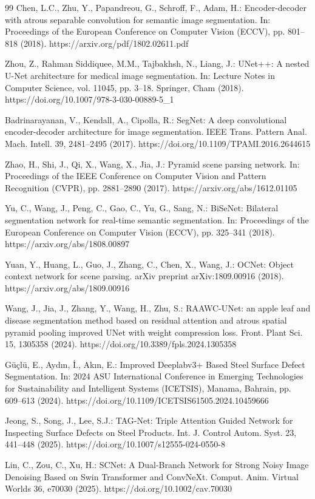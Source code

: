 \documentclass[sn-basic]{sn-jnl}
\theoremstyle{thmstyleone}%
\theoremstyle{thmstyletwo}%
\theoremstyle{thmstylethree}%
\begin{document}
\begin{thebibliography}{99}
 Chen, L.C., Zhu, Y., Papandreou, G., Schroff, F., Adam, H.: Encoder-decoder with atrous separable convolution for semantic image segmentation. In: Proceedings of the European Conference on Computer Vision (ECCV), pp. 801–818 (2018). https://arxiv.org/pdf/1802.02611.pdf

 Zhou, Z., Rahman Siddiquee, M.M., Tajbakhsh, N., Liang, J.: UNet++: A nested U-Net architecture for medical image segmentation. In: Lecture Notes in Computer Science, vol. 11045, pp. 3–18. Springer, Cham (2018). https://doi.org/10.1007/978-3-030-00889-5\_1

 Badrinarayanan, V., Kendall, A., Cipolla, R.: SegNet: A deep convolutional encoder-decoder architecture for image segmentation. IEEE Trans. Pattern Anal. Mach. Intell. 39, 2481–2495 (2017). https://doi.org/10.1109/TPAMI.2016.2644615

 Zhao, H., Shi, J., Qi, X., Wang, X., Jia, J.: Pyramid scene parsing network. In: Proceedings of the IEEE Conference on Computer Vision and Pattern Recognition (CVPR), pp. 2881–2890 (2017). https://arxiv.org/abs/1612.01105

 Yu, C., Wang, J., Peng, C., Gao, C., Yu, G., Sang, N.: BiSeNet: Bilateral segmentation network for real-time semantic segmentation. In: Proceedings of the European Conference on Computer Vision (ECCV), pp. 325–341 (2018). https://arxiv.org/abs/1808.00897

 Yuan, Y., Huang, L., Guo, J., Zhang, C., Chen, X., Wang, J.: OCNet: Object context network for scene parsing. arXiv preprint arXiv:1809.00916 (2018). https://arxiv.org/abs/1809.00916

 Wang, J., Jia, J., Zhang, Y., Wang, H., Zhu, S.: RAAWC-UNet: an apple leaf and disease segmentation method based on residual attention and atrous spatial pyramid pooling improved UNet with weight compression loss. Front. Plant Sci. 15, 1305358 (2024). https://doi.org/10.3389/fpls.2024.1305358

 Güçlü, E., Aydın, İ., Akın, E.: Improved Deeplabv3+ Based Steel Surface Defect Segmentation. In: 2024 ASU International Conference in Emerging Technologies for Sustainability and Intelligent Systems (ICETSIS), Manama, Bahrain, pp. 609–613 (2024). https://doi.org/10.1109/ICETSIS61505.2024.10459666

 Jeong, S., Song, J., Lee, S.J.: TAG-Net: Triple Attention Guided Network for Inspecting Surface Defects on Steel Products. Int. J. Control Autom. Syst. 23, 441–448 (2025). https://doi.org/10.1007/s12555-024-0550-8

 Lin, C., Zou, C., Xu, H.: SCNet: A Dual-Branch Network for Strong Noisy Image Denoising Based on Swin Transformer and ConvNeXt. Comput. Anim. Virtual Worlds 36, e70030 (2025). https://doi.org/10.1002/cav.70030



\end{thebibliography}
\end{document}
